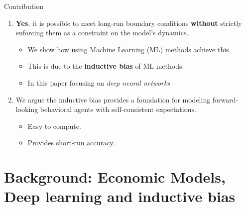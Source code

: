 \documentclass[aspectratio=169,10pt]{beamer}
\newcommand{\emphcolor}[1]{\textbf{\textcolor{emphcolorval}{#1}}}
\begin{document}
\begin{frame}{Contribution}
	
\begin{enumerate}
	\item \emphcolor{Yes}, it is possible to meet
	long-run boundary conditions \emphcolor{without} strictly enforcing them as a constraint on the model’s dynamics.
	\vspace{0.05in}
	\begin{itemize}
		\item We show how using Machine Learning (ML) methods achieve this.
		\vspace{0.025in}
		\item This is due to the \emphcolor{inductive bias} of ML methods.
		\vspace{0.025in} 
		\item In this paper focusing on \emph{deep neural networks}
		\vspace{0.025in} 
	\end{itemize} 
	\item We argue the inductive bias provides a foundation for modeling forward-looking behavioral
	agents with self-consistent expectations.
	\vspace{0.025in}
	\begin{itemize}
		\item Easy to compute. 
		\vspace{0.025in}
		\item Provides short-run accuracy.
		\vspace{0.025in}
	\end{itemize}
\end{enumerate}

\end{frame}

\section{\textcolor{PennBlue}{Background: Economic Models, Deep learning and inductive bias}}
\end{document}
